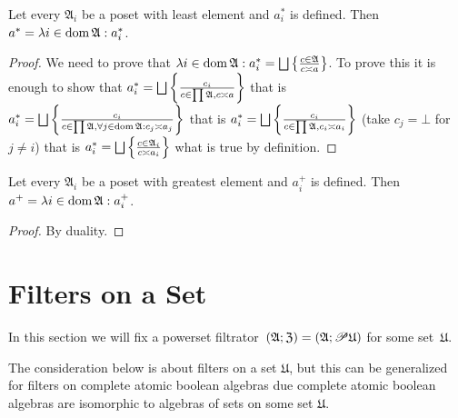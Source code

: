 \begin{prop}
Let every $\mathfrak{A}_{i}$ be a poset with least element and $a_{i}^{\ast}$
is defined. Then $a^{\ast}=\lambda i\in\operatorname{dom}\mathfrak{A}:a_{i}^{\ast}$.\end{prop}
\begin{proof}
We need to prove that $\lambda i\in\operatorname{dom}\mathfrak{A}:a_{i}^{\ast}=\bigsqcup\left\{ \frac{c\in\mathfrak{A}}{c\asymp a}\right\}$.
To prove this it is enough to show that $a_{i}^{\ast}=\bigsqcup\left\{ \frac{c_{i}}{c\in\prod\mathfrak{A},c\asymp a}\right\}$
that is $a_{i}^{\ast}=\bigsqcup\left\{ \frac{c_{i}}{c\in\prod\mathfrak{A},\forall j\in\operatorname{dom}\mathfrak{A}:c_{j}\asymp a_{j}}\right\}$
that is $a_{i}^{\ast}=\bigsqcup\left\{ \frac{c_{i}}{c\in\prod\mathfrak{A},c_{i}\asymp a_{i}}\right\}$
(take $c_{j}=\bot$ for $j\neq i$) that is $a_{i}^{\ast}=\bigsqcup\left\{ \frac{c\in\mathfrak{A}_{i}}{c\asymp a_{i}}\right\}$
what is true by definition.\end{proof}
\begin{cor}
Let every $\mathfrak{A}_{i}$ be a poset with greatest element and
$a_{i}^{+}$ is defined. Then $a^{+}=\lambda i\in\operatorname{dom}\mathfrak{A}:a_{i}^{+}$.\end{cor}
\begin{proof}
By duality.
\end{proof}

\section{Filters on a Set}

In this section we will fix a powerset filtrator~$(\mathfrak{A};\mathfrak{Z})=(\mathfrak{A};\mathscr{P}\mathfrak{U})$
for some set~$\mathfrak{U}$.

The consideration below is about filters on a set $\mathfrak{U}$,
but this can be generalized for filters on complete atomic boolean
algebras due complete atomic boolean algebras are isomorphic to algebras
of sets on some set $\mathfrak{U}$.


